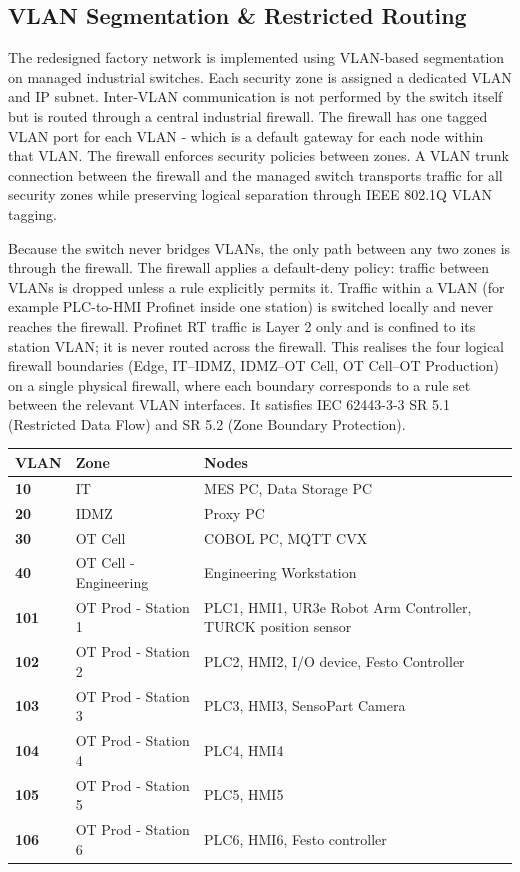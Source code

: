 \documentclass{report}
\begin{document}
\subsection{VLAN Segmentation \& Restricted Routing}
The redesigned factory network is implemented using VLAN-based segmentation on managed industrial switches. Each security zone is assigned a dedicated VLAN and IP subnet. Inter-VLAN communication is not performed by the switch itself but is routed through a central industrial firewall. The firewall has one tagged VLAN port for each VLAN - which is a default gateway for each node within that VLAN. The firewall enforces security policies between zones. A VLAN trunk connection between the firewall and the managed switch transports traffic for all security zones while preserving logical separation through IEEE 802.1Q VLAN tagging.

Because the switch never bridges VLANs, the only path between any two zones is through the firewall. The firewall applies a default-deny policy: traffic between VLANs is dropped unless a rule explicitly permits it. Traffic within a VLAN (for example PLC-to-HMI Profinet inside one station) is switched locally and never reaches the firewall. Profinet RT traffic is Layer 2 only and is confined to its station VLAN; it is never routed across the firewall. This realises the four logical firewall boundaries (Edge, IT–IDMZ, IDMZ–OT Cell, OT Cell–OT Production) on a single physical firewall, where each boundary corresponds to a rule set between the relevant VLAN interfaces. It satisfies IEC 62443-3-3 SR 5.1 (Restricted Data Flow) and SR 5.2 (Zone Boundary Protection).

\renewcommand{\arraystretch}{1.3} %
\begin{tabularx}{\textwidth}{>{\bfseries}p{2.5cm} X X}
    VLAN & \textbf{Zone} & \textbf{Nodes} \vspace{0.5em}\\
\toprule
    10 & IT & MES PC, Data Storage PC \\
    20 & IDMZ & Proxy PC\\
    30 & OT Cell & COBOL PC, MQTT CVX \\
    40 & OT Cell - Engineering & Engineering Workstation  \\
    101 & OT Prod - Station 1 & PLC1, HMI1, UR3e Robot Arm Controller, TURCK position sensor \\
    102 & OT Prod - Station 2 & PLC2, HMI2, I/O device, Festo Controller \\
    103 & OT Prod - Station 3 & PLC3, HMI3, SensoPart Camera \\
    104 & OT Prod - Station 4 & PLC4, HMI4 \\
    105 & OT Prod - Station 5 & PLC5, HMI5 \\
    106 & OT Prod - Station 6 & PLC6, HMI6, Festo controller \\
\end{tabularx}
\end{document}

